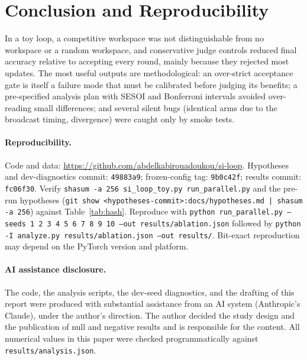 \documentclass[11pt]{article}
\newcommand{\commitHyp}{\texttt{49883a9}}
\newcommand{\commitFrozen}{\texttt{9b0c42f}}
\newcommand{\commitResults}{\texttt{fc06f30}}
\newcommand{\repo}{\url{https://github.com/abdelkabirouadoukou/si-loop}}
\begin{document}
\section{Conclusion and Reproducibility}

In a toy loop, a competitive workspace was not distinguishable from no workspace or a random workspace, and conservative judge controls reduced final accuracy relative to accepting every round,
mainly because they rejected most updates. The most useful outputs are methodological: an over-strict acceptance gate is itself a failure mode that must be calibrated before judging its benefits;
a pre-specified analysis plan with SESOI and Bonferroni intervals avoided over-reading small differences; and several silent bugs (identical arms due to the broadcast timing, divergence) were caught only by smoke tests.

\paragraph{Reproducibility.} Code and data: \repo. Hypotheses and dev-diagnostics commit: \commitHyp; frozen-config tag: \commitFrozen; results commit: \commitResults.
Verify \texttt{shasum -a 256 si\_loop\_toy.py run\_parallel.py} and the pre-run hypotheses (\texttt{git show <hypotheses-commit>:docs/hypotheses.md | shasum -a 256}) against Table~\ref{tab:hash}. Reproduce with
\texttt{python run\_parallel.py --seeds 1 2 3 4 5 6 7 8 9 10 --out results/ablation.json} followed by \texttt{python -I analyze.py results/ablation.json --out results/}.
Bit-exact reproduction may depend on the PyTorch version and platform.

\paragraph{AI assistance disclosure.} The code, the analysis scripts, the dev-seed diagnostics, and the drafting of this report were produced with substantial assistance from an AI system (Anthropic's Claude), under the author's direction.
The author decided the study design and the publication of null and negative results and is responsible for the content. All numerical values in this paper were checked programmatically against \texttt{results/analysis.json}.



\end{document}
